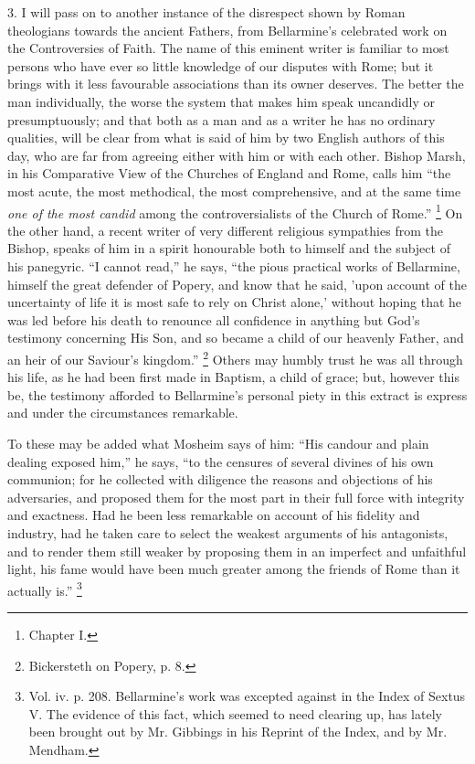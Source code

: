 3. I will pass on to another instance of the disrespect shown by
Roman theologians towards the ancient Fathers, from Bellarmine's
celebrated work on the Controversies of Faith. The name of this
eminent writer is familiar to most persons who have ever so little
knowledge of our disputes with Rome; but it brings with it less
favourable associations than its owner deserves. The better the man
individually, the worse the system that makes him speak uncandidly or
presumptuously; and that both as a man and as a writer he has no
ordinary qualities, will be clear from what is said of him by two
English authors of this day, who are far from agreeing either with him
or with each other. Bishop Marsh, in his Comparative View of the
Churches of England and Rome, calls him ``the most acute, the most
methodical, the most comprehensive, and at the same time \emph{one
of the most candid} among the controversialists of the Church of
Rome.'' \footnote{Chapter I.} On the
other hand, a recent writer of very different religious sympathies
from the Bishop, speaks of him in a spirit honourable both to himself
and the subject of his panegyric. ``I cannot read,'' he says,
``the pious practical works of Bellarmine, himself the great
defender of Popery, and know that he said, 'upon account of the
uncertainty of life it is most safe to rely on Christ alone,' without
hoping that he was led before his death to renounce all confidence in
anything but God's testimony concerning His Son, and so became a child
of our heavenly Father, and an heir of our Saviour's kingdom.'' \footnote{Bickersteth on Popery, p. 8.} Others may humbly trust he was all through his life, as he had
been first made in Baptism, a child of grace; but, however this be,
the testimony afforded to Bellarmine's personal piety in this extract
is express and under the circumstances remarkable.

To these may be added what Mosheim says of him: ``His candour
and plain dealing exposed him,'' he says, ``to the censures of
several divines of his own communion; for he collected with diligence
the reasons and objections of his adversaries, and proposed them for
the most part in their full force with integrity and exactness. Had he
been less remarkable on account of his fidelity and industry, had he
taken care to select the weakest arguments of his antagonists, and to
render them still weaker by proposing them in an imperfect and
unfaithful light, his fame would have been much greater among the
friends of Rome than it actually is.'' \footnote{Vol. iv. p. 208. Bellarmine's work was
excepted against in the Index of Sextus V. The evidence of this fact,
which seemed to need clearing up, has lately been brought out by Mr.
Gibbings in his Reprint of the Index, and by Mr. Mendham.}

